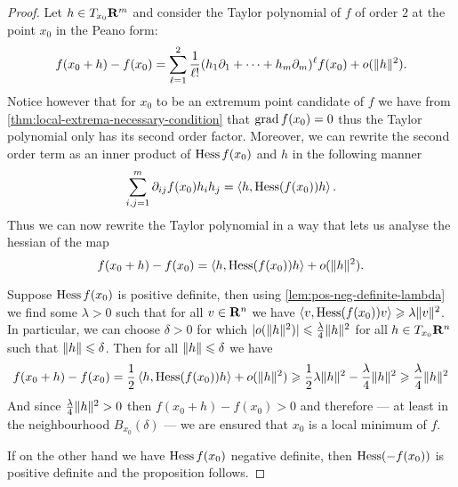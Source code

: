 \begin{proof}
  Let \(h \in T_{x_0}\mathbf{R}^m\) and consider the Taylor polynomial of \(f\) of order
  \(2\) at the point \(x_0\) in the Peano form:
  \[
    f(x_0 + h) - f(x_0) = \sum_{\ell=1}^2 \frac{1}{\ell!} (h_1 \partial_1 + \dots + h_m \partial_m)^{\ell}
    f(x_0) + o(\lVert h\rVert^2).
  \]
  Notice however that for \(x_0\) to be an extremum point candidate of \(f\) we
  have from \cref{thm:local-extrema-necessary-condition} that \(\operatorname{grad} f(x_0) =
  0\) thus the Taylor polynomial only has its second order factor. Moreover, we
  can rewrite the second order term as an inner product of \(\operatorname{Hess} f(x_0)\) and
  \(h\) in the following manner
  \[
    \sum_{i, j = 1}^m \partial_{ij} f(x_0) h_i h_j
    = \left\langle h, \operatorname{Hess}(f(x_0)) h \right\rangle.
  \]
  Thus we can now rewrite the Taylor polynomial in a way that lets us analyse
  the hessian of the map
  \[
    f(x_0 + h) - f(x_0) = \left\langle h, \operatorname{Hess}(f(x_0)) h \right\rangle + o(\lVert h\rVert^2).
  \]

  Suppose \(\operatorname{Hess} f(x_0)\) is positive definite, then using
  \cref{lem:pos-neg-definite-lambda} we find some \(\lambda > 0\) such that for all
  \(v \in \mathbf{R}^n\) we have \(\left\langle v, \operatorname{Hess}(f(x_0)) v \right\rangle \geqslant \lambda \lVert v\rVert^2\). In
  particular, we can choose \(\delta > 0\) for which \(|o(\lVert h\rVert^2)| \leqslant \frac{\lambda}{4}
  \lVert h\rVert^2\) for all \(h \in T_{x_0}\mathbf{R}^n\) such that \(\lVert h\rVert \leqslant \delta\). Then for
  all \(\lVert h\rVert \leqslant \delta\) we have
  \begin{align*}
    f(x_0 + h) - f(x_0)
    = \frac{1}{2} \left\langle h, \operatorname{Hess}(f(x_0)) h \right\rangle + o(\lVert h\rVert^2)
    \geqslant \frac{1}{2} \lambda \lVert h\rVert^2 - \frac{\lambda}{4} \lVert h\rVert^2
    \geqslant \frac{\lambda}{4} \lVert h\rVert^2
  \end{align*}
  And since \(\frac{\lambda}{4} \lVert h\rVert^2 > 0\) then \(f(x_{0} + h) - f(x_0) > 0\)
  and therefore --- at least in the neighbourhood \(B_{x_0}(\delta)\) --- we are ensured
  that \(x_0\) is a local minimum of \(f\).

  If on the other hand we have \(\operatorname{Hess} f(x_0)\) negative definite, then
  \(\operatorname{Hess}(-f(x_0))\) is positive definite and the proposition follows.


\end{proof}
